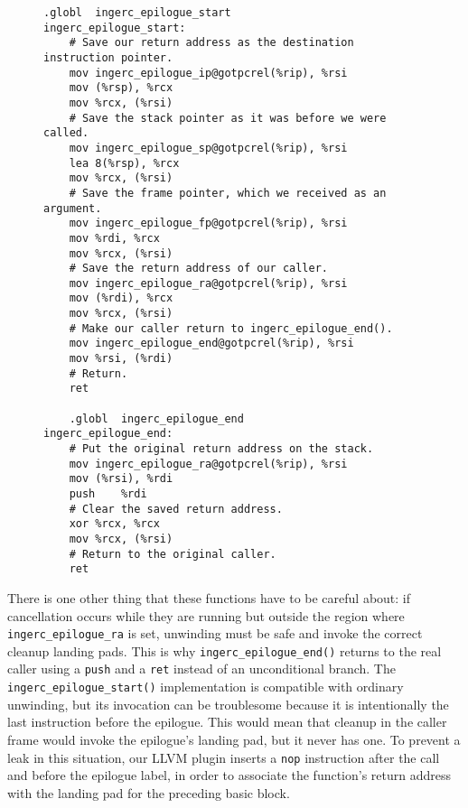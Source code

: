 \begin{figure}
\begin{lstlisting}[label=lst:epilogue,language={[x86masm]Assembler},caption=Code to support time travel out of the epilogue. The \texttt{@gotpcrel} relocations are position-independent GOT lookups of the globals' addresses.]
	.globl	ingerc_epilogue_start
ingerc_epilogue_start:
	# Save our return address as the destination instruction pointer.
	mov	ingerc_epilogue_ip@gotpcrel(%rip), %rsi
	mov	(%rsp), %rcx
	mov	%rcx, (%rsi)
	# Save the stack pointer as it was before we were called.
	mov	ingerc_epilogue_sp@gotpcrel(%rip), %rsi
	lea	8(%rsp), %rcx
	mov	%rcx, (%rsi)
	# Save the frame pointer, which we received as an argument.
	mov	ingerc_epilogue_fp@gotpcrel(%rip), %rsi
	mov	%rdi, %rcx
	mov	%rcx, (%rsi)
	# Save the return address of our caller.
	mov	ingerc_epilogue_ra@gotpcrel(%rip), %rsi
	mov	(%rdi), %rcx
	mov	%rcx, (%rsi)
	# Make our caller return to ingerc_epilogue_end().
	mov	ingerc_epilogue_end@gotpcrel(%rip), %rsi
	mov	%rsi, (%rdi)
	# Return.
	ret

	.globl	ingerc_epilogue_end
ingerc_epilogue_end:
	# Put the original return address on the stack.
	mov	ingerc_epilogue_ra@gotpcrel(%rip), %rsi
	mov	(%rsi), %rdi
	push	%rdi
	# Clear the saved return address.
	xor	%rcx, %rcx
	mov	%rcx, (%rsi)
	# Return to the original caller.
	ret
\end{lstlisting}
\end{figure}

\begin{sloppypar}
There is one other thing that these functions have to be careful about:\@
if cancellation occurs while they are running but outside the region where
\texttt{ingerc\_epilogue\_ra} is set, unwinding must be safe and invoke the correct
cleanup landing pads.  This is why \texttt{ingerc\_epilogue\_end()} returns to the
real caller using a \texttt{push} and a \texttt{ret} instead of an unconditional
branch.  The \texttt{ingerc\_epilogue\_start()} implementation is compatible with
ordinary unwinding, but its invocation can be troublesome because it is
intentionally the last instruction before the epilogue.  This would mean that cleanup
in the caller frame would invoke the epilogue's landing pad, but it never has one.
To prevent a leak in this situation, our LLVM plugin inserts a \texttt{nop}
instruction after the call and before the epilogue label, in order to associate the
function's return address with the landing pad for the
preceding basic block.
\end{sloppypar}


